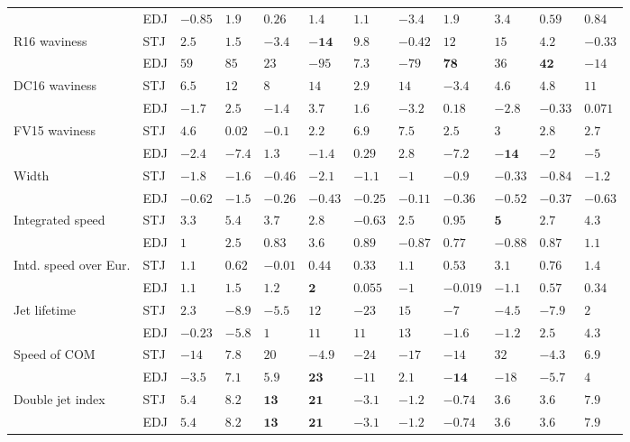 \begin{tabular}{l}
 & EDJ & ${-0.85}$ & ${1.9}$ & ${0.26}$ & ${1.4}$ & ${1.1}$ & ${-3.4}$ & ${1.9}$ & ${3.4}$ & ${0.59}$ & ${0.84}$ \\
R16 waviness & STJ & ${2.5}$ & ${1.5}$ & ${-3.4}$ & $\mathbf{-14}$ & ${9.8}$ & ${-0.42}$ & ${12}$ & ${15}$ & ${4.2}$ & ${-0.33}$ \\
 & EDJ & ${59}$ & ${85}$ & ${23}$ & ${-95}$ & ${7.3}$ & ${-79}$ & $\mathbf{78}$ & ${36}$ & $\mathbf{42}$ & ${-14}$ \\
DC16 waviness & STJ & ${6.5}$ & ${12}$ & ${8}$ & ${14}$ & ${2.9}$ & ${14}$ & ${-3.4}$ & ${4.6}$ & ${4.8}$ & ${11}$ \\
 & EDJ & ${-1.7}$ & ${2.5}$ & ${-1.4}$ & ${3.7}$ & ${1.6}$ & ${-3.2}$ & ${0.18}$ & ${-2.8}$ & ${-0.33}$ & ${0.071}$ \\
FV15 waviness & STJ & $\mathbf{4.6}$ & ${0.02}$ & ${-0.1}$ & ${2.2}$ & ${6.9}$ & ${7.5}$ & ${2.5}$ & ${3}$ & $\mathbf{2.8}$ & ${2.7}$ \\
 & EDJ & ${-2.4}$ & ${-7.4}$ & ${1.3}$ & ${-1.4}$ & ${0.29}$ & ${2.8}$ & $\mathbf{-7.2}$ & $\mathbf{-14}$ & ${-2}$ & ${-5}$ \\
Width & STJ & $\mathbf{-1.8}$ & ${-1.6}$ & ${-0.46}$ & $\mathbf{-2.1}$ & $\mathbf{-1.1}$ & ${-1}$ & $\mathbf{-0.9}$ & ${-0.33}$ & $\mathbf{-0.84}$ & $\mathbf{-1.2}$ \\
 & EDJ & $\mathbf{-0.62}$ & $\mathbf{-1.5}$ & ${-0.26}$ & ${-0.43}$ & ${-0.25}$ & ${-0.11}$ & ${-0.36}$ & ${-0.52}$ & $\mathbf{-0.37}$ & $\mathbf{-0.63}$ \\
Integrated speed & STJ & ${3.3}$ & ${5.4}$ & ${3.7}$ & ${2.8}$ & ${-0.63}$ & ${2.5}$ & ${0.95}$ & $\mathbf{5}$ & ${2.7}$ & ${4.3}$ \\
 & EDJ & ${1}$ & ${2.5}$ & ${0.83}$ & ${3.6}$ & ${0.89}$ & ${-0.87}$ & ${0.77}$ & ${-0.88}$ & ${0.87}$ & ${1.1}$ \\
Intd. speed over Eur. & STJ & ${1.1}$ & ${0.62}$ & ${-0.01}$ & ${0.44}$ & ${0.33}$ & ${1.1}$ & ${0.53}$ & $\mathbf{3.1}$ & ${0.76}$ & ${1.4}$ \\
 & EDJ & $\mathbf{1.1}$ & ${1.5}$ & $\mathbf{1.2}$ & $\mathbf{2}$ & ${0.055}$ & ${-1}$ & ${-0.019}$ & ${-1.1}$ & $\mathbf{0.57}$ & ${0.34}$ \\
Jet lifetime & STJ & ${2.3}$ & ${-8.9}$ & ${-5.5}$ & ${12}$ & ${-23}$ & ${15}$ & ${-7}$ & ${-4.5}$ & ${-7.9}$ & ${2}$ \\
 & EDJ & ${-0.23}$ & ${-5.8}$ & ${1}$ & ${11}$ & ${11}$ & ${13}$ & ${-1.6}$ & ${-1.2}$ & ${2.5}$ & ${4.3}$ \\
Speed of COM & STJ & ${-14}$ & ${7.8}$ & ${20}$ & ${-4.9}$ & ${-24}$ & ${-17}$ & ${-14}$ & ${32}$ & ${-4.3}$ & ${6.9}$ \\
 & EDJ & ${-3.5}$ & ${7.1}$ & ${5.9}$ & $\mathbf{23}$ & ${-11}$ & ${2.1}$ & $\mathbf{-14}$ & ${-18}$ & ${-5.7}$ & ${4}$ \\
Double jet index & STJ & $\mathbf{5.4}$ & ${8.2}$ & $\mathbf{13}$ & $\mathbf{21}$ & ${-3.1}$ & ${-1.2}$ & ${-0.74}$ & ${3.6}$ & $\mathbf{3.6}$ & $\mathbf{7.9}$ \\
 & EDJ & $\mathbf{5.4}$ & ${8.2}$ & $\mathbf{13}$ & $\mathbf{21}$ & ${-3.1}$ & ${-1.2}$ & ${-0.74}$ & ${3.6}$ & $\mathbf{3.6}$ & $\mathbf{7.9}$ \\
\bottomrule
\end{tabular}
